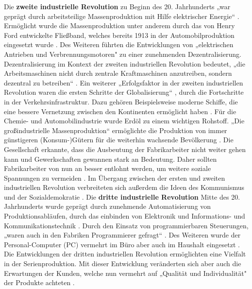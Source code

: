 \newline\newline
Die \textbf{zweite industrielle Revolution} zu Beginn des 20. Jahrhunderts „war geprägt durch arbeitsteilige Massenproduktion mit Hilfe elektrischer Energie“ \cite[S.5]{15}. Ermöglicht wurde die Massenproduktion unter anderem durch das von Henry Ford entwickelte Fließband, welches bereits 1913 in der Automobilproduktion eingesetzt wurde \cite{10}. Des Weiteren führten die Entwicklungen von „elektrischen Antrieben und Verbrennungsmotoren" \cite[S.6]{15} zu einer zunehmenden Dezentralisierung. Dezentralisierung im Kontext der zweiten industriellen Revolution bedeutet, „die Arbeitsmaschinen nicht durch zentrale Kraftmaschinen anzutreiben, sondern dezentral zu betreiben“ \cite[S.6]{15}. Ein weiterer „Erfolgsfaktor in der zweiten industriellen Revolution waren die ersten Schritte der Globalisierung“ \cite{9}, durch die Fortschritte in der Verkehrsinfrastruktur. Dazu gehören Beispielsweise moderne Schiffe, die eine bessere Vernetzung zwischen den Kontinenten ermöglicht haben \cite{9}. Für die Chemie- und Automobilindustrie wurde Erdöl zu einem wichtigen Rohstoff. „Die großindustrielle Massenproduktion“ \cite[S.6]{15} ermöglichte die Produktion von immer günstigeren (Konsum-)Gütern für die weiterhin wachsende Bevölkerung \cite[S.6]{15}. Die Gesellschaft erkannte, dass die Ausbeutung der Fabrikarbeiter nicht weiter gehen kann und Gewerkschaften gewannen stark an Bedeutung. Daher sollten Fabrikarbeiter von nun an besser entlohnt werden, um weitere soziale Spannungen zu vermeiden \cite[S.6]{15}. Im Übergang zwischen der ersten und zweiten industriellen Revolution verbreiteten sich außerdem die Ideen des Kommunismus und der Sozialdemokratie \cite[S.6]{15}.
\newline\newline
Die \textbf{dritte industrielle Revolution} Mitte des 20. Jahrhunderts wurde geprägt durch zunehmende Automatisierung von Produktionsabläufen, durch das einbinden von Elektronik und Informations- und Kommunikationstechnik \cite[S.7]{15}. Durch den Einsatz von programmierbaren Steuerungen, „waren auch in den Fabriken Programmierer gefragt“ \cite{10}. Des Weiteren wurde der Personal-Computer (PC) vermehrt im Büro aber auch im Haushalt eingesetzt \cite{9}. Die Entwicklungen der dritten industriellen Revolution ermöglichten eine Vielfalt in der Serienproduktion. Mit dieser Entwicklung veränderten sich aber auch die Erwartungen der Kunden, welche nun vermehrt auf „Qualität und Individualität" \cite[S.7]{15} der Produkte achteten \cite[S.7]{15}.
